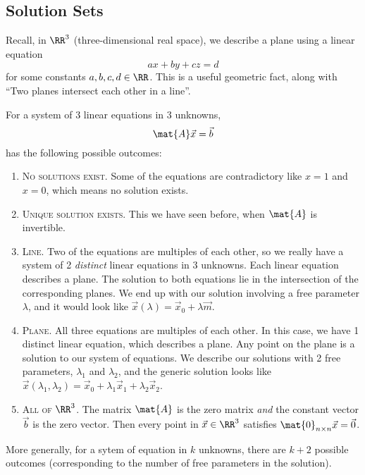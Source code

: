 
\subsection{Solution Sets}

Recall, in $\RR^{3}$ (three-dimensional real space), we describe a plane
using a linear equation
\begin{equation}
ax + by + cz = d
\end{equation}
for some constants $a,b,c,d\in\RR$. This is a useful geometric fact,
along with ``Two planes intersect each other in a line''.

For a system of 3 linear equations in 3 unknowns,
\begin{equation}
\mat{A}\vec{x}=\vec{b}
\end{equation}
has the following possible outcomes:
\begin{enumerate}
\item \textsc{No solutions exist.} Some of the equations are
  contradictory like $x=1$ and $x=0$, which means no solution exists.
\item \textsc{Unique solution exists.} This we have seen before, when
  $\mat{A}$ is invertible.
\item \textsc{Line.} Two of the equations are multiples of each other,
  so we really have a system of 2 \emph{distinct} linear equations in 3
  unknowns. Each linear equation describes a plane. The solution to both
  equations lie in the intersection of the corresponding planes. We end
  up with our solution involving a free parameter $\lambda$, and it
  would look like $\vec{x}(\lambda) = \vec{x}_{0} + \lambda\vec{m}$.
\item \textsc{Plane.} All three equations are multiples of each
  other. In this case, we have 1 distinct linear equation, which
  describes a plane. Any point on the plane is a solution to our system
  of equations. We describe our solutions with 2 free parameters,
  $\lambda_{1}$ and $\lambda_{2}$, and the generic solution looks like
  $\vec{x}(\lambda_{1},\lambda_{2}) = \vec{x}_{0} + \lambda_{1}\vec{x}_{1}+\lambda_{2}\vec{x}_{2}$.
\item \textsc{All of $\RR^{3}$.} The matrix $\mat{A}$ is the zero
  matrix \emph{and} the constant vector $\vec{b}$ is the zero
  vector. Then every point in $\vec{x}\in\RR^{3}$ satisfies
  $\mat{0}_{n\times n}\vec{x}=\vec{0}$.
\end{enumerate}

\M
More generally, for a sytem of equation in $k$ unknowns, there are $k+2$
possible outcomes (corresponding to the number of free parameters in the
solution). 